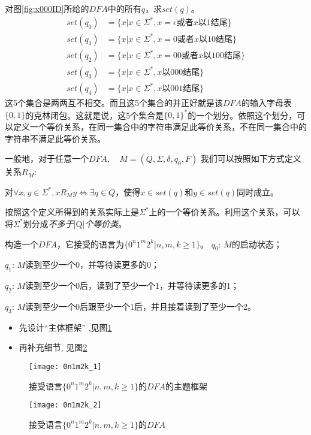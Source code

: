 \begin{example}
	对图\ref{fig:x000ID}所给的$DFA$中的所有$q$，求$set(q)$。
	\begin{align*}
		set(q_0) &=\{x|x\in\Sigma^{\ast},x=\epsilon\text{或者$x$以1结尾}\} \\
		set(q_1) &=\{x|x\in\Sigma^{\ast},x=0\text{或者$x$以10结尾}\} \\
		set(q_2) &=\{x|x\in\Sigma^{\ast},x=00\text{或者$x$以100结尾}\} \\
		set(q_3) &=\{x|x\in\Sigma^{\ast},\text{$x$以000结尾}\} \\
		set(q_4) &=\{x|x\in\Sigma^{\ast},\text{$x$以001结尾}\}
	\end{align*}
	这5个集合是两两互不相交。而且这5个集合的并正好就是该$DFA$的输入字母表$\{0,1\}$的克林闭包。这就是说，这5个集合是$\{0,1\}^\ast$的一个划分。依照这个划分，可以定义一个等价关系，在同一集合中的字符串满足此等价关系，不在同一集合中的字符串不满足此等价关系。
\end{example}

一般地，对于任意一个$DFA,\quad M=(Q,\Sigma,\delta,q_0,F)$ 我们可以按照如下方式定义关系$R_M$:

对$\forall x,y\in\Sigma^{\ast},xR_My \Leftrightarrow \exists q\in Q$，使得$x\in set(q)$和$y\in set(q)$同时成立。

按照这个定义所得到的关系实际上是$\Sigma^{\ast}$上的一个等价关系。利用这个关系，可以将$\Sigma^{\ast}$划分成\emph{不多于}|Q|\emph{个等价类}。 

\begin{example}
	构造一个$DFA$，它接受的语言为$\{0^n1^m2^k|n,m,k\ge 1\}$。 
	$q_0$: $M$的启动状态；
	
	$q_1$: $M$读到至少一个0，并等待读更多的0；
	
	$q_2$: $M$读到至少一个0后，读到了至少一个1，并等待读更多的1；
	
	$q_3$: $M$读到至少一个0后跟至少一个1后，并且接着读到了至少一个2。 
	\begin{itemize}
		\item 先设计“主体框架” ,见图\ref{fig:0n1m2k_1}
		\item 再补充细节, 见图\ref{fig:0n1m2k_2}
	\end{itemize}
	\begin{figure}[htbp]
		\texttt{[image: 0n1m2k\_1]}
		\caption{接受语言$\{0^n1^m2^k|n,m,k\ge 1\}$的$DFA$的主题框架}
		\label{fig:0n1m2k_1}       %
	\end{figure}

	\begin{figure}[htbp]
		\texttt{[image: 0n1m2k\_2]}
		\caption{接受语言$\{0^n1^m2^k|n,m,k\ge 1\}$的$DFA$}
		\label{fig:0n1m2k_2}       %
	\end{figure}
\end{example}


